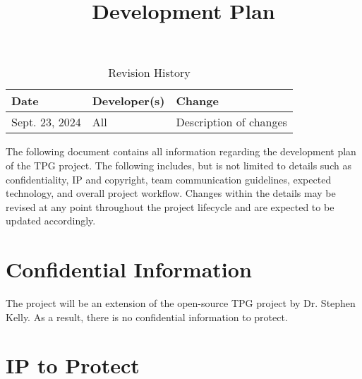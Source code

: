 \documentclass{article}
\title{Development Plan\\\progname}
\author{\authname}
\date{}
\begin{document}
\maketitle

\begin{table}[hp]
\caption{Revision History} \label{TblRevisionHistory}
\begin{tabularx}{\textwidth}{llX}
\toprule
\textbf{Date} & \textbf{Developer(s)} & \textbf{Change}\\
\midrule
Sept. 23, 2024 & All & Description of changes\\
\bottomrule
\end{tabularx}
\end{table}

\newpage{}



\noindent The following document contains all information regarding the development plan of the TPG project. The following includes, but is not limited to details such as confidentiality, IP and copyright, team communication guidelines, expected technology, and overall project workflow. Changes within the details may be revised at any point throughout the project lifecycle and are expected to be updated accordingly.
\section{Confidential Information}



The project will be an extension of the open-source TPG project by Dr. Stephen Kelly. As a result, there is no confidential information to protect.
\section{IP to Protect}
\end{document}
